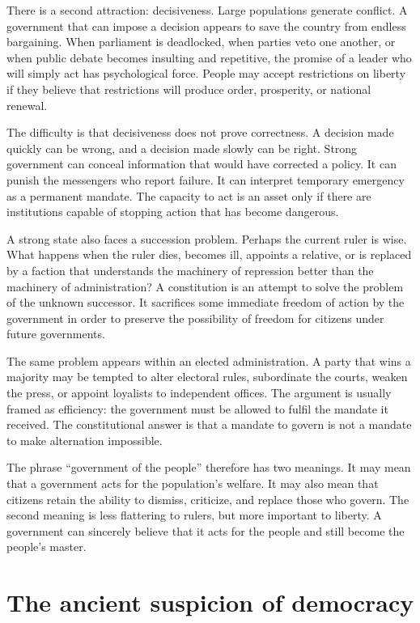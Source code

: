 ﻿\documentclass[12pt,a4paper]{book}
\begin{document}
There is a second attraction: decisiveness.  Large populations generate
conflict.  A government that can impose a decision appears to save the
country from endless bargaining.  When parliament is deadlocked, when
parties veto one another, or when public debate becomes insulting and
repetitive, the promise of a leader who will simply act has psychological
force.  People may accept restrictions on liberty if they believe that
restrictions will produce order, prosperity, or national renewal.

The difficulty is that decisiveness does not prove correctness.  A decision
made quickly can be wrong, and a decision made slowly can be right.  Strong
government can conceal information that would have corrected a policy.  It
can punish the messengers who report failure.  It can interpret temporary
emergency as a permanent mandate.  The capacity to act is an asset only if
there are institutions capable of stopping action that has become dangerous.

A strong state also faces a succession problem.  Perhaps the current ruler
is wise.  What happens when the ruler dies, becomes ill, appoints a relative,
or is replaced by a faction that understands the machinery of repression
better than the machinery of administration?  A constitution is an attempt
to solve the problem of the unknown successor.  It sacrifices some immediate
freedom of action by the government in order to preserve the possibility of
freedom for citizens under future governments.

The same problem appears within an elected administration.  A party that
wins a majority may be tempted to alter electoral rules, subordinate the
courts, weaken the press, or appoint loyalists to independent offices.  The
argument is usually framed as efficiency: the government must be allowed to
fulfil the mandate it received.  The constitutional answer is that a mandate
to govern is not a mandate to make alternation impossible.

The phrase ``government of the people'' therefore has two meanings.  It may
mean that a government acts for the population's welfare.  It may also mean
that citizens retain the ability to dismiss, criticize, and replace those
who govern.  The second meaning is less flattering to rulers, but more
important to liberty.  A government can sincerely believe that it acts for
the people and still become the people’s master.

\section{The ancient suspicion of democracy}
\end{document}
